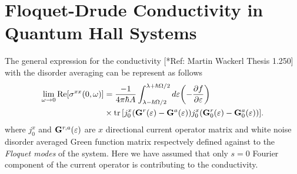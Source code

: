 \section{Floquet-Drude Conductivity in Quantum Hall Systems}

The general expression for the conductivity [*Ref: Martin Wackerl Thesis 1.250] with the disorder averaging can be represent as follows
\begin{equation} \label{7.1}
  \begin{aligned}
    \lim_{\omega \to 0}
    \text{Re}[{\sigma}^{xx}(0,\omega)] &=
    \frac{-1}{4\pi\hbar A}
    \int_{\lambda-\hbar\Omega/2}^{\lambda+ \hbar\Omega/2} d\varepsilon
    \qty(
    -\frac{\partial f}{\partial \varepsilon})
    \\
    & \times
    \tr
    \qty[
    {j}^x_0
    \qty(
    \mathbf{G}^{r} (\varepsilon) - \mathbf{G}^{a} (\varepsilon)
    )
    {j}^x_0
    \qty(
    \mathbf{G}^{r}_0 (\varepsilon) - \mathbf{G}^{a}_0 (\varepsilon)
    )
    ].
  \end{aligned}
\end{equation}
where ${j}^x_0$ and $\mathbf{G}^{r,a} (\varepsilon)$ are $x$ directional current operator matrix and white noise disorder averaged Green function matrix respectvely defined against to the \textit{Floquet modes} of the system. Here we have assumed that only $s=0$ Fourier component of the current operator is contributing to the conductivity.

